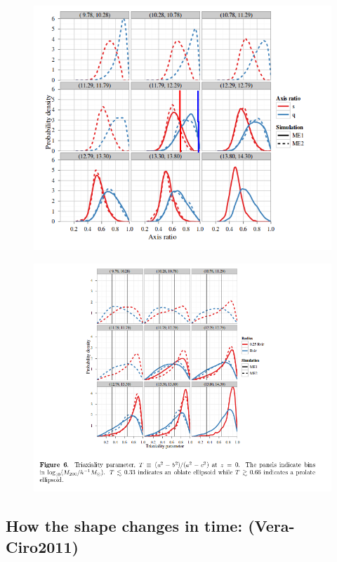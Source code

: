 \documentclass[12pt]{article}
\begin{document}
\begin{figure}[H]
\centering
\includegraphics[scale=0.5]{distribution.png}
\end{figure}

\begin{figure}[H]
\centering
\includegraphics[scale=0.5]{triaxial.png}
\end{figure}


\subsection{How the shape changes in time: (Vera-Ciro2011)}
\end{document}
